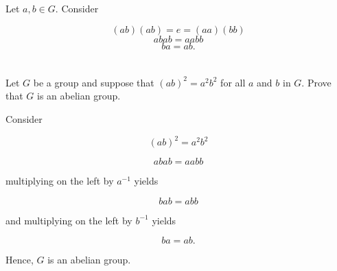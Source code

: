 \documentclass[a4paper]{article}
\begin{document}
\vspace{\baselineskip}

Let $a,b \in G$. Consider

$$(ab)(ab) = e = (aa)(bb)$$
$$abab = aabb$$
$$ ba = ab.$$


\section{}


\section{}

Let $G$ be a group and suppose that $(ab)^2 = a^2b^2$ for all $a$ and $b$ in $G$. Prove that $G$ is an abelian group.

\vspace{\baselineskip}

Consider

$$(ab)^2 = a^2b^2$$

$$abab = aa bb$$

multiplying on the left by $a^{-1}$ yields

$$bab = abb$$

and multiplying on the left by $b^{-1}$ yields

$$ba = ab.$$

Hence, $G$ is an abelian group.


\section{}


\section{}


\section{}


\section{}


\section{}


\section{}
\end{document}
